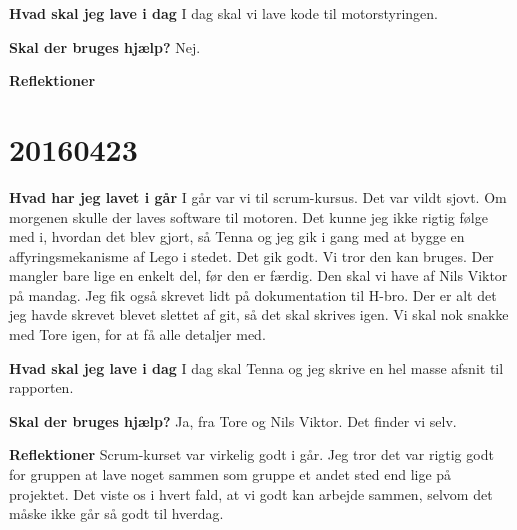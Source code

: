 \documentclass{article}
\begin{document}
	\textbf{Hvad skal jeg lave i dag}
	I dag skal vi lave kode til motorstyringen. 
	
	\textbf{Skal der bruges hjælp?}
	Nej.  
	
	\textbf{Reflektioner}
	
	\section{20160423}
	
	\textbf{Hvad har jeg lavet i går}
	I går var vi til scrum-kursus. Det var vildt sjovt. Om morgenen skulle der laves software til motoren. Det kunne jeg ikke rigtig følge med i, hvordan det blev gjort, så Tenna og jeg gik i gang med at bygge en affyringsmekanisme af Lego i stedet. Det gik godt. Vi tror den kan bruges. Der mangler bare lige en enkelt del, før den er færdig. Den skal vi have af Nils Viktor på mandag. Jeg fik også skrevet lidt på dokumentation til H-bro. Der er alt det jeg havde skrevet blevet slettet af git, så det skal skrives igen. Vi skal nok snakke med Tore igen, for at få alle detaljer med. 
	
	\textbf{Hvad skal jeg lave i dag}
	I dag skal Tenna og jeg skrive en hel masse afsnit til rapporten. 
	
	\textbf{Skal der bruges hjælp?}
	Ja, fra Tore og Nils Viktor. Det finder vi selv. 
	
	\textbf{Reflektioner}
	Scrum-kurset var virkelig godt i går. Jeg tror det var rigtig godt for gruppen at lave noget sammen som gruppe et andet sted end lige på projektet. Det viste os i hvert fald, at vi godt kan arbejde sammen, selvom det måske ikke går så godt til hverdag. 
	
	
\end{document}

